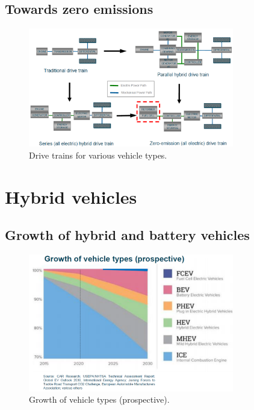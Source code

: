 \subsection{Towards zero emissions}
\begin{figure}[H]
    \centering
    \includegraphics[width = 0.8\textwidth]{img/figure96.png}
    \caption{Drive trains for various vehicle types.}
\end{figure}
\section{Hybrid vehicles}
\subsection{Growth of hybrid and battery vehicles}
\begin{figure}[H]
    \centering
    \includegraphics[width = 0.8\textwidth]{img/figure97.png}
    \caption{Growth of vehicle types (prospective).}
\end{figure}
